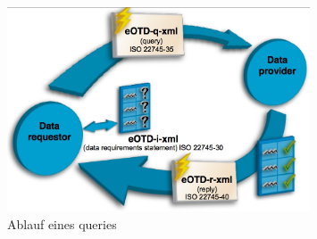 \begin{figure}[htbp]
	\centering
		\includegraphics[width=0.8\textwidth]{images/ig_query_response.jpg}
	\caption{Ablauf eines queries}
	\label{fig:ig_query_response}
\end{figure}
